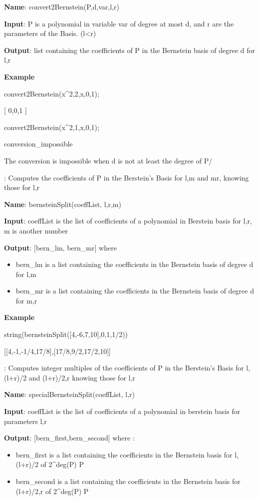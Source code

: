 \documentclass{article}
\begin{document}
{\bf Name}: convert2Bernstein(P,d,var,l,r)
  
{\bf Input}: P is a polynomial in variable var of degree at most d,  and r are the parameters of the Basis. (l<r)
  
{\bf Output}: list containing the coefficients of P in the Bernstein basis of
  degree d for l,r
  
{\bf Example}

convert2Bernstein(x\^{}2,2,x,0,1);

[ 0,0,1 ]

convert2Bernstein(x\^{}2,1,x,0,1);

conversion\_impossible

The conversion is impossible when d is not at least the degree of P/
  
:
  Computes the coefficients of P in the Berstein's Basis for l,m and mr,
  knowing those for l,r
  
{\bf Name}: bernsteinSplit(coeffList, l,r,m)
  
{\bf Input}: coeffList is the list of coefficients of a polynomial in Berstein
  basis for l,r, m is another number
  
 {\bf  Output}: [bern\_lm, bern\_mr] where
  \begin{itemize}
    \item bern\_lm is a list containing the coefficients in the Bernstein
    basis of degree d for l,m
    \item bern\_mr is a list containing the coefficients in the Bernstein
    basis of degree d for m,r
  \end{itemize}
  
{\bf Example}

string(bernsteinSplit([4,-6,7,10],0,1,1/2))

[[4,-1,-1/4,17/8],[17/8,9/2,17/2,10]]
  


:
  Computes integer multiples of the coefficients of P in the Berstein's Basis
  for l,(l+r)/2 and (l+r)/2,r knowing those for l,r
  
{\bf Name}: specialBernsteinSplit(coeffList, l,r)
  
{\bf Input}: coeffList is the list of coefficients of a polynomial in berstein
  basis for parameters l,r
  
{\bf Output}: [bern\_first,bern\_second] where :
  \begin{itemize}
    \item bern\_first is a list containing the coefficients in the Bernstein
    basis for l,(l+r)/2 of 2\^{}deg(P) P
    \item bern\_second is a list containing the coefficients in the Bernstein
    basis for (l+r)/2,r of 2\^{}deg(P) P
  \end{itemize}
  
\end{document}
